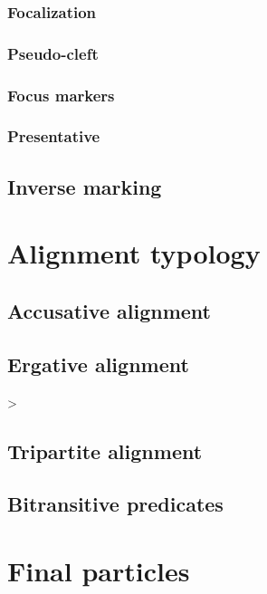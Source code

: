 \documentclass[oldfontcommands,oneside,a4paper,11pt]{memoir}
\begin{document}
\subsection{Focalization}


\subsection{Pseudo-cleft}
 

\subsection{Focus markers}
 


\subsection{Presentative}


 \section{Inverse marking} \label{sec:inverse.discourse}

\chapter{Alignment typology}

\section{Accusative alignment}
 
\section{Ergative alignment}
 
> 
\section{Tripartite alignment}
 
\section{Bitransitive predicates} \label{sec:bitransitive}



\chapter{Final particles}

\tableofcontents


\end{document}
